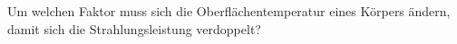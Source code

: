 Um welchen Faktor muss sich die Oberflächentemperatur eines Körpers ändern, damit sich die Strahlungsleistung verdoppelt?
